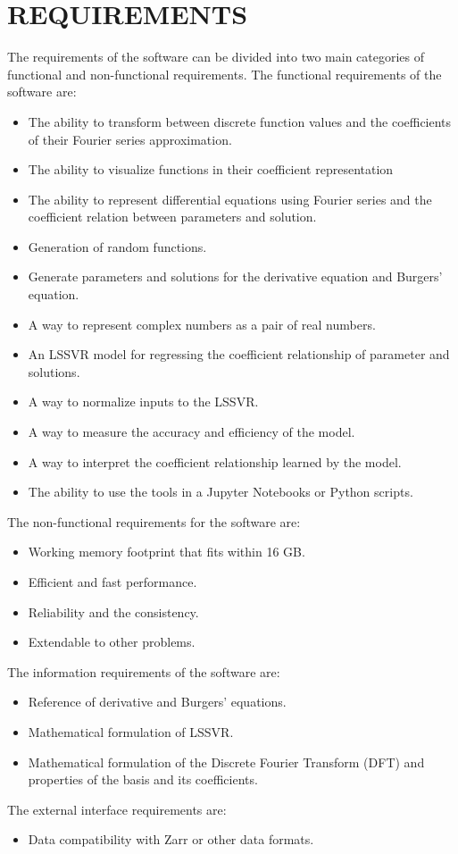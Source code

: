 \chapter{REQUIREMENTS}
The requirements of the software can be divided into two main categories of functional and non-functional requirements. The functional requirements of the software are:\nopagebreak
\begin{itemize}
    \item The ability to transform between discrete function values and the coefficients of their Fourier series approximation.
    \item The ability to visualize functions in their coefficient representation
    \item The ability to represent differential equations using Fourier series and the coefficient relation between parameters and solution.
    \item Generation of random functions.
    \item Generate parameters and solutions for the derivative equation and Burgers' equation.
    \item A way to represent complex numbers as a pair of real numbers.
    \item An LSSVR model for regressing the coefficient relationship of parameter and solutions.
    \item A way to normalize inputs to the LSSVR.
    \item A way to measure the accuracy and efficiency of the model.
    \item A way to interpret the coefficient relationship learned by the model.
    \item The ability to use the tools in a Jupyter Notebooks or Python scripts.
\end{itemize}

\noindent The non-functional requirements for the software are:\nopagebreak
\begin{itemize}
    \item Working memory footprint that fits within 16 GB\@.
    \item Efficient and fast performance.
    \item Reliability and the consistency.
    \item Extendable to other problems.
\end{itemize}
\filbreak
\noindent The information requirements of the software are:
\begin{itemize}
    \item Reference of derivative and Burgers' equations.
    \item Mathematical formulation of LSSVR.
    \item Mathematical formulation of the Discrete Fourier Transform (DFT) and properties of the basis and its coefficients.
\end{itemize}

\noindent The external interface requirements are:\nopagebreak
\begin{itemize}
    \item Data compatibility with Zarr or other data formats.
\end{itemize}
